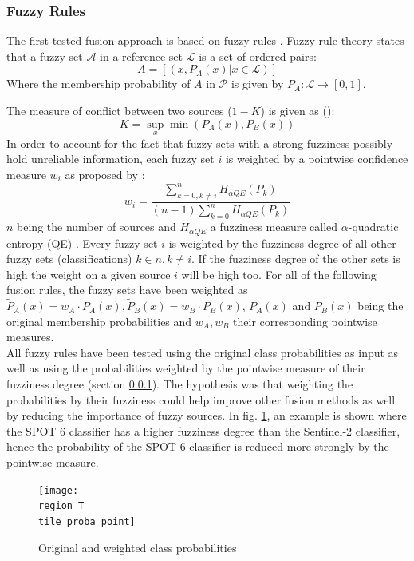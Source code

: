 \documentclass[10pt]{article}
\newcommand{\tile}{41000_30000}
\newcommand{\region}{finistere}
\begin{document}
\subsubsection{Fuzzy Rules}\label{sec:fuzzyLogic}
The first tested fusion approach is based on fuzzy rules \cite{zadeh_fuzzy_1965}. Fuzzy rule theory states that a fuzzy set $\mathcal{A}$ in a reference set $\mathcal{L}$ is a set of ordered pairs:
\begin{equation}
    A=[(x,P_A(x)|x\in \mathcal{L})]
\end{equation}
Where the membership probability of $A$ in $\mathcal{P}$ is given by $P_A:\mathcal{L}\rightarrow[0,1]$.

The measure of conflict between two sources ($1-K$) is given as (\cite{ouerghemmi_two-step_2017,dubois_possibility}):
\begin{equation}
    K=\sup_x\min(P_A(x), P_B(x))
\end{equation}
In order to account for the fact that fuzzy sets with a strong fuzziness possibly hold unreliable information, each fuzzy set $i$ is weighted by a pointwise confidence measure $w_i$ as proposed by \cite{fauvel_decision_fusion}:
\begin{equation}
    w_i=\frac{\sum_{k=0,k\neq i}^{n}H_{\alpha QE}(P_k)}{(n-1)\sum_{k=0}^{n}H_{\alpha QE}(P_k)}
\end{equation}
$n$ being the number of sources and $H_{\alpha QE}$ a fuzziness measure called $\alpha$-quadratic entropy (QE) \parencite{pal_measuring_1994}. Every fuzzy set $i$ is weighted by the fuzziness degree of all other fuzzy sets (classifications) $k\in n,k\neq i$. If the fuzziness degree of the other sets is high the weight on a given source $i$ will be high too. For all of the following fusion rules, the fuzzy sets have been weighted as $\tilde{P}_A(x)=w_A\cdot P_A(x), \tilde{P}_B(x)=w_B\cdot P_B(x)$, $P_A(x)$ and $P_B(x)$ being the original membership probabilities and $w_A, w_B$ their corresponding pointwise measures.\\

All fuzzy rules have been tested using the original class probabilities as input  as well as using the probabilities weighted by the pointwise measure of their fuzziness degree (section \ref{sec:fuzzyLogic}). The hypothesis was that weighting the probabilities by their fuzziness could help improve other fusion methods as well by reducing the importance of fuzzy sources. In fig. \ref{fig:proba_point}, an example is shown where the SPOT 6 classifier has a higher fuzziness degree than the Sentinel-2 classifier, hence the probability of the SPOT 6 classifier is reduced more strongly by the pointwise measure.
\begin{figure}[H]
    \centering
    \texttt{[image: \\region\_T\\tile\_proba\_point]}
    \caption{Original and weighted class probabilities}
    \label{fig:proba_point}
\end{figure}
\end{document}
